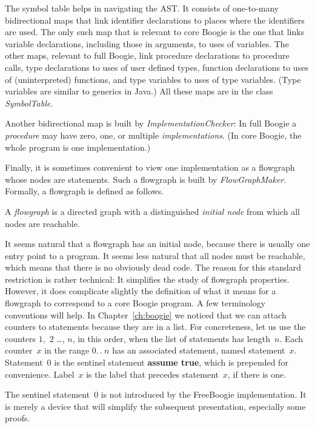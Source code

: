 \documentclass{llncs}
\begin{document}
The symbol table helps in navigating the AST\null. It consists of
one-to-many bidirectional maps that link identifier declarations
to places where the identifiers are used. The only such
map that is relevant to core Boogie is the one that links
variable declarations, including those in arguments, to uses
of variables. The other maps, relevant to full Boogie, link
procedure declarations to procedure calls, type declarations to
uses of user defined types, function declarations to uses of
(uninterpreted) functions, and type variables to uses of type
variables. (Type variables are similar to generics in Java.) All
these maps are in the class \textit{SymbolTable}.

Another bidirectional map is built by
\textit{ImplementationChecker}: In full Boogie a \emph{procedure}
may have zero, one, or multiple \emph{implementations}. (In core
Boogie, the whole program is one implementation.)

Finally, it is sometimes convenient to view one implementation as
a flowgraph whose nodes are statements. Such a flowgraph is built
by \textit{FlowGraphMaker}. Formally, a flowgraph is defined as
follows.

\begin{definition}
A \emph{flowgraph} is a directed graph with a distinguished
\emph{initial node} from which all nodes are reachable.
\end{definition}

It seems natural that a flowgraph has an initial node, because
there is usually one entry point to a program. It seems less
natural that all nodes must be reachable, which means that
there is no obviously dead code. The reason for this standard
restriction is rather technical: It simplifies the study of
flowgraph properties. However, it does complicate slightly the
definition of what it means for a flowgraph to correspond to a
core Boogie program. A few terminology conventions will help. In
Chapter~\ref{ch:boogie} we noticed that we can attach counters
to statements because they are in a list. For concreteness, let
us use the counters $1$,~$2$ \dots, $n$, in this order, when the
list of statements has length~$n$. Each counter~$x$ in the range
$0.\,.\>n$ has an associated statement, named statement~$x$.
Statement~$0$ is the sentinel statement \textbf{assume true},
which is prepended for convenience. Label~$x$ is the label that
precedes statement~$x$, if there is one.

\begin{remark}
The sentinel statement~$0$ is not introduced by the FreeBoogie
implementation. It is merely a device that will simplify the
subsequent presentation, especially some proofs.
\end{remark}
\end{document}
